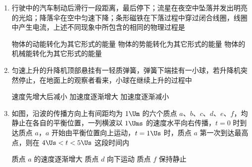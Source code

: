 \documentclass[\gkver]{gaokaozhenti}
\begin{document}
\begin{enumerate}
\onepicture[h=3.34cm]{}

{$F_{1}-F_{2}$}
{$F_{1}+F_{2}$}
{$2F_{1}-F_{2}$}


\item
行驶中的汽车制动后滑行一段距离，最后停下；流星在夜空中坠落并发出明亮的光焰；降落伞在空中匀速下降；条形磁铁在下落过程中穿过闭合线圈，线圈中产生电流，上述不同现象中所包含的相同的物理过程是

{物体的动能转化为其它形式的能量}
{物体的势能转化为其它形式的能量}
{物体的机械能转化为其它形式的能量}


\item
匀速上升的升降机顶部悬挂有一轻质弹簧，弹簧下端挂有一小球，若升降机突然停止，在地面上的观察者看来，小球在继续上升的过程中

{速度先增大后减小}
{加速度逐渐增大}
{加速度逐渐减小}


\item
如图，沿波的传播方向上有间距均为 $1\Um$ 的六个质点 $a$、$b$、$c$、$d$、$e$、$f$，均静止在各自的平衡位置，一列横波以 $1\Ums$ 的速度水平向右传播，$t=0$ 时到达质点 $a$，$a$ 开始由平衡位置向上运动，$t=1\Us$ 时，质点 $a$ 第一次到达最高点，则在 $4\Us<t<5\Us$ 这段时间内

\onepicture[w=7.50cm]{}

{质点 $a$ 的速度逐渐增大}
{质点 $d$ 向下运动}
{质点 $f$ 保持静止}



\end{enumerate}
\end{document}
